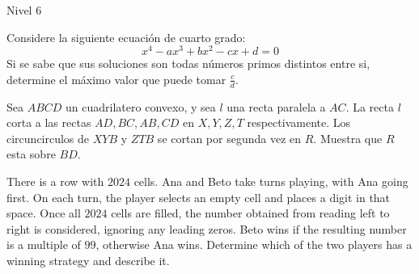 \documentclass[12pt]{article}
\begin{document}
\begin{examen}{Nivel 6}{}
\begin{problema}
    Considere la siguiente ecuación de cuarto grado:
    \[x^4-ax^3+bx^2-cx+d=0\]
    Si se sabe que sus soluciones son todas n\'umeros primos distintos entre si, determine el m\'aximo valor que puede tomar $\frac cd$.
\end{problema}

\begin{problema}
    Sea $ABCD$ un cuadrilatero convexo, y sea $l$ una recta paralela a $AC$. La recta $l$ corta a las rectas $AD,BC,AB,CD$ en $X,Y,Z,T$ respectivamente. Los circuncirculos de $XYB$ y $ZTB$ se cortan por segunda vez en $R$. Muestra que $R$ esta sobre $BD$.
\end{problema}

\begin{problema}
    There is a row with $2024$ cells. Ana and Beto take turns playing, with Ana going first. On each turn, the player selects an empty cell and places a digit in that space. Once all $2024$ cells are filled, the number obtained from reading left to right is considered, ignoring any leading zeros. Beto wins if the resulting number is a multiple of $99$, otherwise Ana wins. Determine which of the two players has a winning strategy and describe it.
\end{problema}

\end{examen}
\end{document}
